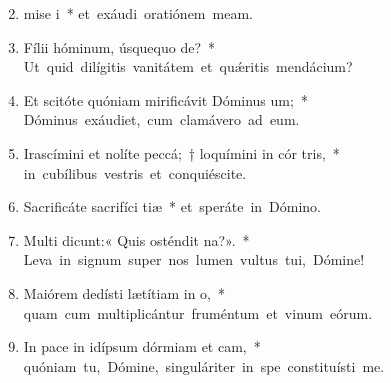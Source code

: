 \begin{flushleft}
\begin{enumerate}[leftmargin=*]
\setcounter{enumi}{1}
\item mise i~* \mbox{et exáudi oratiónem meam.}

\item Fílii hóminum, úsquequo  de?~* \mbox{Ut quid dilígitis vanitátem et qu\'{\ae}ritis mendácium?}

\item Et scitóte quóniam mirificávit Dóminus  um;~* \mbox{Dóminus exáudiet, cum clamávero ad eum.}

\item Irascímini et nolíte peccá;~† loquímini in cór tris,~* \mbox{in cubílibus vestris et conquiéscite.}

\item Sacrificáte sacrifíci tiæ~* \mbox{et speráte in Dómino.}

\item Multi dicunt:« Quis osténdit  na?».~* \mbox{Leva in signum super nos lumen vultus tui, Dómine!}

\item Maiórem dedísti lætítiam in  o,~* \mbox{quam cum multiplicántur fruméntum et vinum eórum.}

\item In pace in idípsum dórmiam et cam,~* \mbox{quóniam tu, Dómine, singuláriter in spe constituísti me.}
\end{enumerate}
\end{flushleft}

